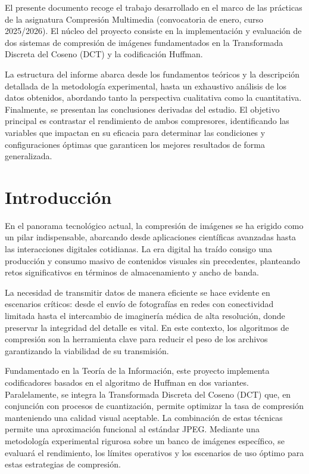 \documentclass[a4paper, 12pt]{article}
\begin{document}
El presente documento recoge el trabajo desarrollado en el marco de las prácticas de la asignatura Compresión Multimedia (convocatoria de enero, curso 2025/2026). El núcleo del proyecto consiste en la implementación y evaluación de dos sistemas de compresión de imágenes fundamentados en la Transformada Discreta del Coseno (DCT) y la codificación Huffman.

La estructura del informe abarca desde los fundamentos teóricos y la descripción detallada de la metodología experimental, hasta un exhaustivo análisis de los datos obtenidos, abordando tanto la perspectiva cualitativa como la cuantitativa. Finalmente, se presentan las conclusiones derivadas del estudio. El objetivo principal es contrastar el rendimiento de ambos compresores, identificando las variables que impactan en su eficacia para determinar las condiciones y configuraciones óptimas que garanticen los mejores resultados de forma generalizada.

\newpage 
\section{Introducción}

En el panorama tecnológico actual, la compresión de imágenes se ha erigido como un pilar indispensable, abarcando desde aplicaciones científicas avanzadas hasta las interacciones digitales cotidianas. La era digital ha traído consigo una producción y consumo masivo de contenidos visuales sin precedentes, planteando retos significativos en términos de almacenamiento y ancho de banda.

La necesidad de transmitir datos de manera eficiente se hace evidente en escenarios críticos: desde el envío de fotografías en redes con conectividad limitada hasta el intercambio de imaginería médica de alta resolución, donde preservar la integridad del detalle es vital. En este contexto, los algoritmos de compresión son la herramienta clave para reducir el peso de los archivos garantizando la viabilidad de su transmisión.

Fundamentado en la Teoría de la Información, este proyecto implementa codificadores basados en el algoritmo de Huffman en dos variantes. Paralelamente, se integra la Transformada Discreta del Coseno (DCT) que, en conjunción con procesos de cuantización, permite optimizar la tasa de compresión manteniendo una calidad visual aceptable. La combinación de estas técnicas permite una aproximación funcional al estándar JPEG. Mediante una metodología experimental rigurosa sobre un banco de imágenes específico, se evaluará el rendimiento, los límites operativos y los escenarios de uso óptimo para estas estrategias de compresión.
\end{document}
